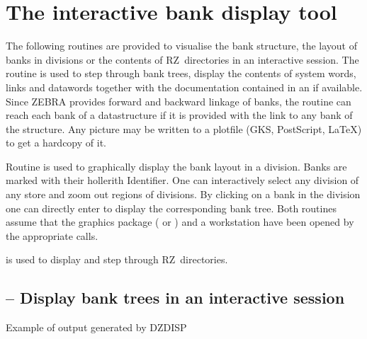 \section{The interactive bank display tool}
\label{sec:dzdocdzdisp} 
 
The following routines are provided to visualise the bank structure,
the layout of banks in divisions or the contents of RZ~directories 
in an interactive session. 
The routine 
is used to step through bank trees, display the contents of system
words, links and datawords together with the documentation contained
in an \RZfile{} if available.
Since ZEBRA provides forward and backward linkage of banks,
the routine can reach each bank of a datastructure if it is provided
with the link to any bank of the structure. 
Any picture may be written to a plotfile 
(GKS, PostScript, LaTeX) to get a hardcopy of it.
 
Routine  is used to graphically display the bank layout
in a division. 
Banks are marked with their hollerith Identifier.
One can interactively select any division of any store and
zoom out regions of divisions. 
By clicking on a bank in the division
one can directly enter  to display the corresponding bank tree.
Both routines assume that the graphics package (\cite{bib-GKS1} or
\cite{bib-HIGZ}) and a workstation
have been opened by the appropriate calls.
 
\newpage 

 is used to display and step through RZ~directories.
\subsection[{\tt DZDISP} -- Display bank trees in an interactive session]%
           { -- Display bank trees in an interactive session}
\begin{Fighere}
\begin{center}
\caption{Example of output generated by DZDISP}
\end{center}
\end{Fighere}
 
\newpage

 
